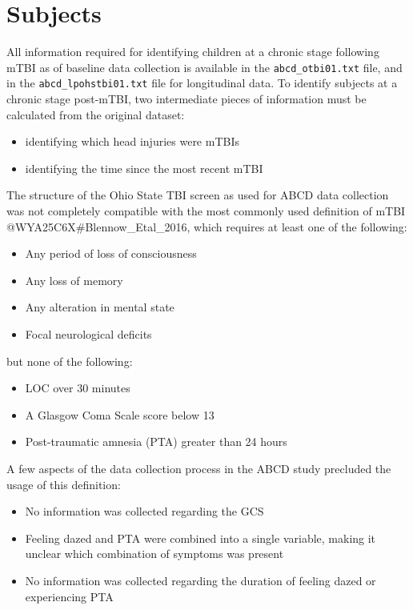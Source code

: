 \documentclass[
  letterpaper,
  DIV=11,
  numbers=noendperiod]{scrreprt}
\providecommand{\tightlist}{%
  \setlength{\itemsep}{0pt}\setlength{\parskip}{0pt}}\usepackage{longtable,booktabs,array}
\begin{document}
\section{Subjects}\label{subjects}

All information required for identifying children at a chronic stage
following mTBI as of baseline data collection is available in the
\texttt{abcd\_otbi01.txt} file, and in the \texttt{abcd\_lpohstbi01.txt}
file for longitudinal data. To identify subjects at a chronic stage
post-mTBI, two intermediate pieces of information must be calculated
from the original dataset:

\begin{itemize}
\tightlist
\item
  identifying which head injuries were mTBIs
\item
  identifying the time since the most recent mTBI
\end{itemize}

The structure of the Ohio State TBI screen as used for ABCD data
collection was not completely compatible with the most commonly used
definition of mTBI @WYA25C6X\#Blennow\_Etal\_2016, which requires at
least one of the following:

\begin{itemize}
\tightlist
\item
  Any period of loss of consciousness
\item
  Any loss of memory
\item
  Any alteration in mental state
\item
  Focal neurological deficits
\end{itemize}

but none of the following:

\begin{itemize}
\tightlist
\item
  LOC over 30 minutes
\item
  A Glasgow Coma Scale score below 13
\item
  Post-traumatic amnesia (PTA) greater than 24 hours
\end{itemize}

A few aspects of the data collection process in the ABCD study precluded
the usage of this definition:

\begin{itemize}
\tightlist
\item
  No information was collected regarding the GCS
\item
  Feeling dazed and PTA were combined into a single variable, making it
  unclear which combination of symptoms was present
\item
  No information was collected regarding the duration of feeling dazed
  or experiencing PTA
\end{itemize}
\end{document}

